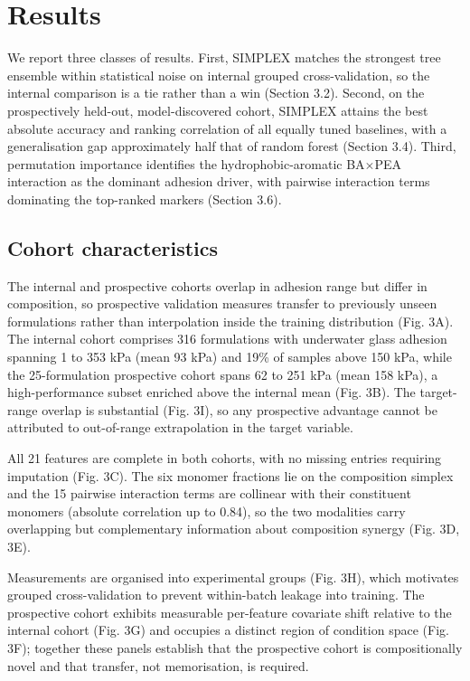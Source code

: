 \section{Results}

We report three classes of results. First, SIMPLEX matches the strongest tree ensemble within statistical noise on internal grouped cross-validation, so the internal comparison is a tie rather than a win (Section 3.2). Second, on the prospectively held-out, model-discovered cohort, SIMPLEX attains the best absolute accuracy and ranking correlation of all equally tuned baselines, with a generalisation gap approximately half that of random forest (Section 3.4). Third, permutation importance identifies the hydrophobic-aromatic BA$\times$PEA interaction as the dominant adhesion driver, with pairwise interaction terms dominating the top-ranked markers (Section 3.6).

\subsection{Cohort characteristics}

The internal and prospective cohorts overlap in adhesion range but differ in composition, so prospective validation measures transfer to previously unseen formulations rather than interpolation inside the training distribution (Fig. 3A). The internal cohort comprises 316 formulations with underwater glass adhesion spanning 1 to 353 kPa (mean 93 kPa) and 19\% of samples above 150 kPa, while the 25-formulation prospective cohort spans 62 to 251 kPa (mean 158 kPa), a high-performance subset enriched above the internal mean (Fig. 3B). The target-range overlap is substantial (Fig. 3I), so any prospective advantage cannot be attributed to out-of-range extrapolation in the target variable.

All 21 features are complete in both cohorts, with no missing entries requiring imputation (Fig. 3C). The six monomer fractions lie on the composition simplex and the 15 pairwise interaction terms are collinear with their constituent monomers (absolute correlation up to 0.84), so the two modalities carry overlapping but complementary information about composition synergy (Fig. 3D, 3E).

Measurements are organised into experimental groups (Fig. 3H), which motivates grouped cross-validation to prevent within-batch leakage into training. The prospective cohort exhibits measurable per-feature covariate shift relative to the internal cohort (Fig. 3G) and occupies a distinct region of condition space (Fig. 3F); together these panels establish that the prospective cohort is compositionally novel and that transfer, not memorisation, is required.

